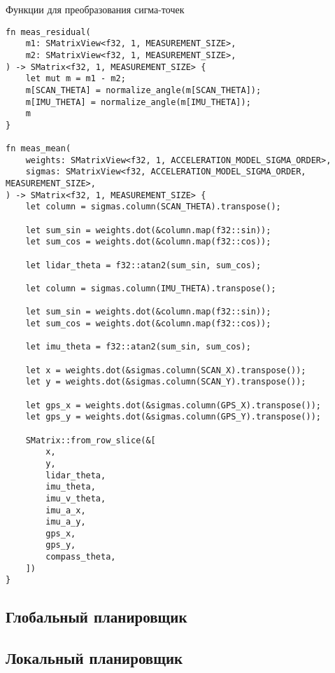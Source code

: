 Функции для преобразования сигма-точек
\begin{lstlisting}
fn meas_residual(
    m1: SMatrixView<f32, 1, MEASUREMENT_SIZE>,
    m2: SMatrixView<f32, 1, MEASUREMENT_SIZE>,
) -> SMatrix<f32, 1, MEASUREMENT_SIZE> {
    let mut m = m1 - m2;
    m[SCAN_THETA] = normalize_angle(m[SCAN_THETA]);
    m[IMU_THETA] = normalize_angle(m[IMU_THETA]);
    m
}

fn meas_mean(
    weights: SMatrixView<f32, 1, ACCELERATION_MODEL_SIGMA_ORDER>,
    sigmas: SMatrixView<f32, ACCELERATION_MODEL_SIGMA_ORDER, MEASUREMENT_SIZE>,
) -> SMatrix<f32, 1, MEASUREMENT_SIZE> {
    let column = sigmas.column(SCAN_THETA).transpose();

    let sum_sin = weights.dot(&column.map(f32::sin));
    let sum_cos = weights.dot(&column.map(f32::cos));

    let lidar_theta = f32::atan2(sum_sin, sum_cos);

    let column = sigmas.column(IMU_THETA).transpose();

    let sum_sin = weights.dot(&column.map(f32::sin));
    let sum_cos = weights.dot(&column.map(f32::cos));

    let imu_theta = f32::atan2(sum_sin, sum_cos);

    let x = weights.dot(&sigmas.column(SCAN_X).transpose());
    let y = weights.dot(&sigmas.column(SCAN_Y).transpose());

    let gps_x = weights.dot(&sigmas.column(GPS_X).transpose());
    let gps_y = weights.dot(&sigmas.column(GPS_Y).transpose());

    SMatrix::from_row_slice(&[
        x,
        y,
        lidar_theta,
        imu_theta,
        imu_v_theta,
        imu_a_x,
        imu_a_y,
        gps_x,
        gps_y,
        compass_theta,
    ])
}
\end{lstlisting}


\subsection{Глобальный планировщик}




\subsection{Локальный планировщик}

